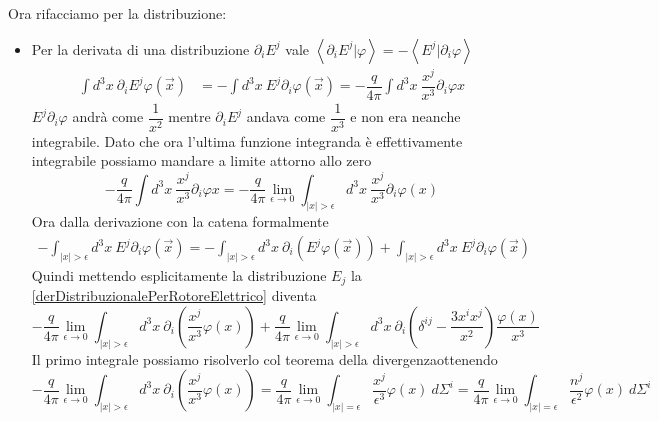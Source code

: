 \documentclass[12pt,a4paper,titlepage, twoside, openright]{book}
\numberwithin{equation}{chapter}
\begin{document}
Ora rifacciamo per la distribuzione:
\begin{itemize}
\item Per la derivata di una distribuzione $\partial_i E^j$ vale $\left\langle \partial_i E^j | \varphi \right\rangle = -\left\langle E^j | \partial_i\varphi \right\rangle$
\begin{align*}
\int d^3x \> \partial_i E^j \varphi(\vec{x}) &= - \int d^3x \> E^j \partial_i\varphi(\vec{x}) = -\dfrac{q}{4\pi}\int d^3x \> \dfrac{x^j}{x^3} \partial_i\varphi{x}
\end{align*}
$E^j\partial_i\varphi$ andrà come $\dfrac{1}{x^2}$ mentre $\partial_iE^j$ andava come $\dfrac{1}{x^3}$ e non era neanche integrabile. Dato che ora l'ultima funzione integranda è effettivamente integrabile possiamo mandare a limite attorno allo zero
\begin{equation}\label{derDistribuzionalePerRotoreElettrico}
-\dfrac{q}{4\pi}\int d^3x \> \dfrac{x^j}{x^3} \partial_i\varphi{x} =  -\dfrac{q}{4\pi} \lim_{\epsilon\rightarrow 0} \int_{\left|x\right|>\epsilon} d^3x \> \dfrac{x^j}{x^3} \partial_i\varphi(x)
\end{equation}
Ora dalla derivazione con la catena formalmente
\begin{align*}
- \int_{\left|x\right|>\epsilon} d^3x \> E^j \partial_i\varphi(\vec{x}) = - \int_{\left|x\right|>\epsilon} d^3x \> \partial_i\left(  E^j \varphi(\vec{x})\right) + \int_{\left|x\right|>\epsilon} d^3x \> E^j \partial_i\varphi(\vec{x}) 
\end{align*}
Quindi mettendo esplicitamente la distribuzione $E_j$ la \ref{derDistribuzionalePerRotoreElettrico} diventa
\[
-\dfrac{q}{4\pi} \lim_{\epsilon\rightarrow 0} \int_{\left|x\right|>\epsilon} d^3x \> \partial_i \left(\dfrac{x^j}{x^3}\varphi(x)\right) + 
\dfrac{q}{4\pi} \lim_{\epsilon\rightarrow 0} \int_{\left|x\right|>\epsilon} d^3x \> \partial_i \left( \delta^{ij}-\dfrac{3x^ix^j}{x^2} \right) \dfrac{\varphi(x)}{x^3} 
\]
Il primo integrale possiamo risolverlo col teorema della divergenza\footnotemark          ottenendo 
\[
-\dfrac{q}{4\pi} \lim_{\epsilon\rightarrow 0} \int_{\left|x\right|>\epsilon} d^3x \> \partial_i \left(\dfrac{x^j}{x^3}\varphi(x)\right) = \dfrac{q}{4\pi} \lim_{\epsilon\rightarrow 0} \int_{\left|x\right|=\epsilon} \dfrac{x^j}{\epsilon^3}\varphi(x) \> d\Sigma^i = \dfrac{q}{4\pi} \lim_{\epsilon\rightarrow 0} \int_{\left|x\right|=\epsilon} \dfrac{n^j}{\epsilon^2}\varphi(x) \> d\Sigma^i 
\]
\end{itemize}
\end{document}
